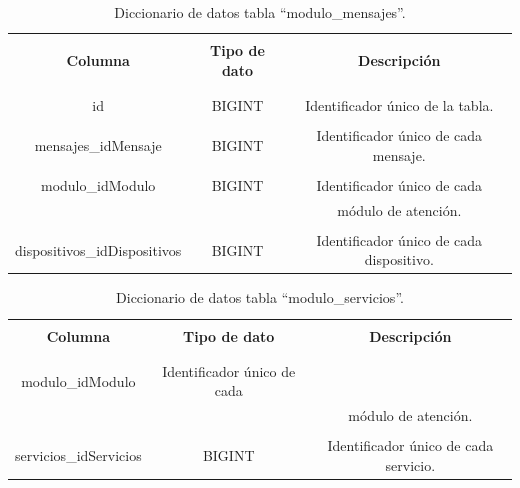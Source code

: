 \begin{spacing}{1.0}
	\begin{table}[H]
		\centering
		\caption{Diccionario de datos tabla ``modulo\_mensajes''.} 
		\begin{tabular}{|c|c|c|}
			\hline 
			\rowcolor{gray!30} &&\\
			\rowcolor{gray!30} \textbf{Columna} & \textbf{Tipo de dato} & \textbf{Descripción} \\ 
			\rowcolor{gray!30} &&\\
			\hline 
			&&\\[-0.2cm]
			id & BIGINT & Identificador único de la tabla. \\
			\hline 
			&&\\[-0.2cm]
			mensajes\_idMensaje & BIGINT & Identificador único de cada mensaje. \\
			\hline
			&&\\[-0.2cm]
			modulo\_idModulo & BIGINT & Identificador único de cada \\
			 & & módulo de atención. \\
			\hline
			&&\\[-0.2cm]
			dispositivos\_idDispositivos & BIGINT & Identificador único de cada dispositivo. \\
			\hline 
		\end{tabular}
		\label{diccionario_servicios}
	\end{table}
\end{spacing}

\begin{spacing}{1.0}
	\begin{table}[H]
		\centering
		\caption{Diccionario de datos tabla ``modulo\_servicios''.} 
		\begin{tabular}{|c|c|c|}
			\hline 
			\rowcolor{gray!30} &&\\
			\rowcolor{gray!30} \textbf{Columna} & \textbf{Tipo de dato} & \textbf{Descripción} \\ 
			\rowcolor{gray!30} &&\\
			\hline 
			&&\\[-0.2cm]
			modulo\_idModulo & Identificador único de cada \\
			 & & módulo de atención. \\
			\hline 
			&&\\[-0.2cm]
			servicios\_idServicios & BIGINT & Identificador único de cada servicio. \\
			\hline
		\end{tabular}
		\label{diccionario_servicios}
	\end{table}
\end{spacing}



